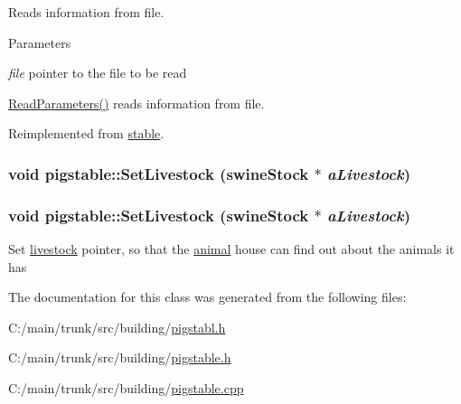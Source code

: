 Reads information from file. 
\begin{DoxyParams}{Parameters}
\item[{\em file}]pointer to the file to be read\end{DoxyParams}
\hyperlink{classpigstable_a97e3706555a93da782e5418df532078c}{ReadParameters()} reads information from file. 

Reimplemented from \hyperlink{classstable_ab0195f308a48e008485cf5d04955a741}{stable}.\hypertarget{classpigstable_a9ad970c3d281c92caea8010ac353bbd1}{
\subsubsection[{SetLivestock}]{\setlength{\rightskip}{0pt plus 5cm}void pigstable::SetLivestock ({\bf swineStock} $\ast$ {\em aLivestock})}}
\label{classpigstable_a9ad970c3d281c92caea8010ac353bbd1}
\hypertarget{classpigstable_a9ad970c3d281c92caea8010ac353bbd1}{
\subsubsection[{SetLivestock}]{\setlength{\rightskip}{0pt plus 5cm}void pigstable::SetLivestock ({\bf swineStock} $\ast$ {\em aLivestock})}}
\label{classpigstable_a9ad970c3d281c92caea8010ac353bbd1}
Set \hyperlink{classlivestock}{livestock} pointer, so that the \hyperlink{classanimal}{animal} house can find out about the animals it has 

The documentation for this class was generated from the following files:\begin{DoxyCompactItemize}
\item 
C:/main/trunk/src/building/\hyperlink{pigstabl_8h}{pigstabl.h}\item 
C:/main/trunk/src/building/\hyperlink{pigstable_8h}{pigstable.h}\item 
C:/main/trunk/src/building/\hyperlink{pigstable_8cpp}{pigstable.cpp}\end{DoxyCompactItemize}
